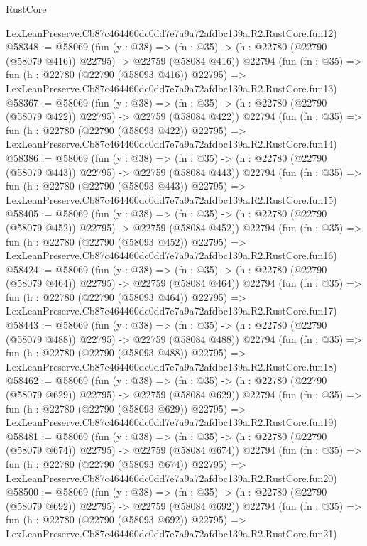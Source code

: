 \begin{lexlean}{RustCore}
\begin{coremodule}
    LexLeanPreserve.Cb87c464460dc0dd7e7a9a72afdbc139a.R2.RustCore.fun12)
@58348 := @58069
    (fun (y : @38) =>
    (fn : @35) -> (h : @22780 (@22790 (@58079 @416)) @22795) -> @22759 (@58084 @416))
    @22794
    (fun (fn : @35) =>
    fun (h : @22780 (@22790 (@58093 @416)) @22795) =>
    LexLeanPreserve.Cb87c464460dc0dd7e7a9a72afdbc139a.R2.RustCore.fun13)
@58367 := @58069
    (fun (y : @38) =>
    (fn : @35) -> (h : @22780 (@22790 (@58079 @422)) @22795) -> @22759 (@58084 @422))
    @22794
    (fun (fn : @35) =>
    fun (h : @22780 (@22790 (@58093 @422)) @22795) =>
    LexLeanPreserve.Cb87c464460dc0dd7e7a9a72afdbc139a.R2.RustCore.fun14)
@58386 := @58069
    (fun (y : @38) =>
    (fn : @35) -> (h : @22780 (@22790 (@58079 @443)) @22795) -> @22759 (@58084 @443))
    @22794
    (fun (fn : @35) =>
    fun (h : @22780 (@22790 (@58093 @443)) @22795) =>
    LexLeanPreserve.Cb87c464460dc0dd7e7a9a72afdbc139a.R2.RustCore.fun15)
@58405 := @58069
    (fun (y : @38) =>
    (fn : @35) -> (h : @22780 (@22790 (@58079 @452)) @22795) -> @22759 (@58084 @452))
    @22794
    (fun (fn : @35) =>
    fun (h : @22780 (@22790 (@58093 @452)) @22795) =>
    LexLeanPreserve.Cb87c464460dc0dd7e7a9a72afdbc139a.R2.RustCore.fun16)
@58424 := @58069
    (fun (y : @38) =>
    (fn : @35) -> (h : @22780 (@22790 (@58079 @464)) @22795) -> @22759 (@58084 @464))
    @22794
    (fun (fn : @35) =>
    fun (h : @22780 (@22790 (@58093 @464)) @22795) =>
    LexLeanPreserve.Cb87c464460dc0dd7e7a9a72afdbc139a.R2.RustCore.fun17)
@58443 := @58069
    (fun (y : @38) =>
    (fn : @35) -> (h : @22780 (@22790 (@58079 @488)) @22795) -> @22759 (@58084 @488))
    @22794
    (fun (fn : @35) =>
    fun (h : @22780 (@22790 (@58093 @488)) @22795) =>
    LexLeanPreserve.Cb87c464460dc0dd7e7a9a72afdbc139a.R2.RustCore.fun18)
@58462 := @58069
    (fun (y : @38) =>
    (fn : @35) -> (h : @22780 (@22790 (@58079 @629)) @22795) -> @22759 (@58084 @629))
    @22794
    (fun (fn : @35) =>
    fun (h : @22780 (@22790 (@58093 @629)) @22795) =>
    LexLeanPreserve.Cb87c464460dc0dd7e7a9a72afdbc139a.R2.RustCore.fun19)
@58481 := @58069
    (fun (y : @38) =>
    (fn : @35) -> (h : @22780 (@22790 (@58079 @674)) @22795) -> @22759 (@58084 @674))
    @22794
    (fun (fn : @35) =>
    fun (h : @22780 (@22790 (@58093 @674)) @22795) =>
    LexLeanPreserve.Cb87c464460dc0dd7e7a9a72afdbc139a.R2.RustCore.fun20)
@58500 := @58069
    (fun (y : @38) =>
    (fn : @35) -> (h : @22780 (@22790 (@58079 @692)) @22795) -> @22759 (@58084 @692))
    @22794
    (fun (fn : @35) =>
    fun (h : @22780 (@22790 (@58093 @692)) @22795) =>
    LexLeanPreserve.Cb87c464460dc0dd7e7a9a72afdbc139a.R2.RustCore.fun21)

\end{coremodule}
\end{lexlean}
